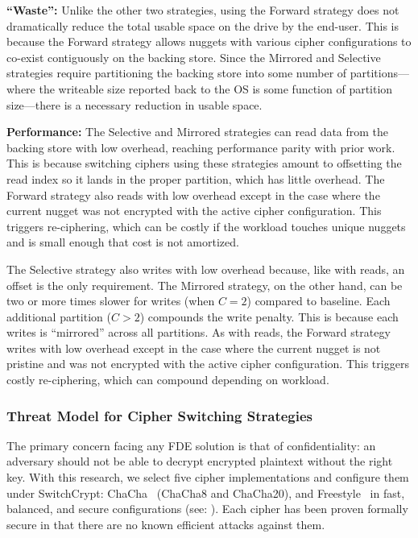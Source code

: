 \textbf{``Waste'':} Unlike the other two strategies, using the Forward strategy
does not dramatically reduce the total usable space on the drive by the
end-user. This is because the Forward strategy allows nuggets with various
cipher configurations to co-exist contiguously on the backing store. Since the
Mirrored and Selective strategies require partitioning the backing store into
some number of partitions---where the writeable size reported back to the OS is
some function of partition size---there is a necessary reduction in usable
space.

\textbf{Performance:} The Selective and Mirrored strategies can read data from
the backing store with low overhead, reaching performance parity with prior
work. This is because switching ciphers using these strategies amount to
offsetting the read index so it lands in the proper partition, which has little
overhead. The Forward strategy also reads with low overhead except in the case
where the current nugget was not encrypted with the active cipher configuration.
This triggers re-ciphering, which can be costly if the workload touches unique
nuggets and is small enough that cost is not amortized.

The Selective strategy also writes with low overhead because, like with reads,
an offset is the only requirement. The Mirrored strategy, on the other hand, can
be two or more times slower for writes (when $C = 2$) compared to baseline. Each
additional partition ($C > 2$) compounds the write penalty. This is because each
writes is ``mirrored'' across all partitions. As with reads, the Forward
strategy writes with low overhead except in the case where the current nugget is
not pristine and was not encrypted with the active cipher configuration. This
triggers costly re-ciphering, which can compound depending on workload.

\subsubsection{Threat Model for Cipher Switching Strategies}

The primary concern facing any FDE solution is that of confidentiality: an
adversary should not be able to decrypt encrypted plaintext without the right
key. With this research, we select five cipher implementations and configure
them under SwitchCrypt: ChaCha~\cite{ChaCha20} (ChaCha8 and ChaCha20), and
Freestyle~\cite{Freestyle} in fast, balanced, and secure configurations (see:
). Each cipher has been proven formally secure in that
there are no known efficient attacks against them.

